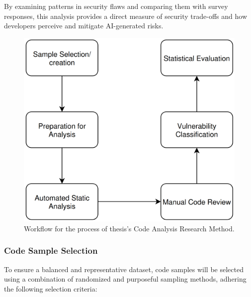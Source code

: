 By examining patterns in security flaws and comparing them with survey responses, this analysis provides a direct measure of security trade-offs and how developers perceive and mitigate AI-generated risks.


\begin{figure}[H]
    \centering
    \includegraphics[width=0.9\columnwidth]{assets/data-analysis.png}
    \caption{Workflow for the process of thesis's Code Analysis Research Method.}
    \label{fig:data_analysis_diagram}
\end{figure}

\subsubsection{Code Sample Selection}
To ensure a balanced and representative dataset, code samples will be selected using a combination of randomized and purposeful sampling methods, adhering the following selection criteria:

